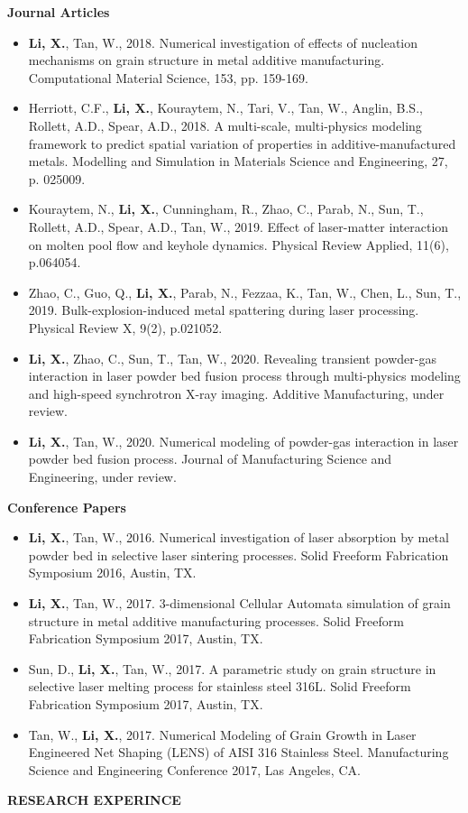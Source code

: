 \documentclass[11pt, letterpaper]{article}
\begin{document}
\textbf{Journal Articles}
\begin{itemize}[leftmargin=*, labelsep=4mm]
   \item \textbf{Li, X.}, Tan, W., 2018. Numerical investigation of effects of nucleation mechanisms on grain structure in metal additive manufacturing. Computational Material Science, 153, pp. 159-169.
   \item Herriott, C.F., \textbf{Li, X.}, Kouraytem, N., Tari, V., Tan, W., Anglin, B.S., Rollett, A.D., Spear, A.D., 2018. A multi-scale, multi-physics modeling framework to predict spatial variation of properties in additive-manufactured metals. Modelling and Simulation in Materials Science and Engineering, 27, p. 025009.
   \item Kouraytem, N., \textbf{Li, X.}, Cunningham, R., Zhao, C., Parab, N., Sun, T., Rollett, A.D., Spear, A.D., Tan, W., 2019. Effect of laser-matter interaction on molten pool flow and keyhole dynamics. Physical Review Applied, 11(6), p.064054.
   \item Zhao, C., Guo, Q., \textbf{Li, X.}, Parab, N., Fezzaa, K., Tan, W., Chen, L., Sun, T., 2019. Bulk-explosion-induced metal spattering during laser processing. Physical Review X, 9(2), p.021052.
   \item \textbf{Li, X.}, Zhao, C., Sun, T., Tan, W., 2020. Revealing transient powder-gas interaction in laser powder bed fusion process through multi-physics modeling and high-speed synchrotron X-ray imaging. Additive Manufacturing, under review. 
   \item \textbf{Li, X.}, Tan, W., 2020. Numerical modeling of powder-gas interaction in laser powder bed fusion process. Journal of Manufacturing Science and Engineering, under review. 
\end{itemize}
\vspace{3pt}
\textbf{Conference Papers}
\begin{itemize}[leftmargin=*, labelsep=5mm]
   \item \textbf{Li, X.}, Tan, W., 2016. Numerical investigation of laser absorption by metal powder bed in selective laser sintering processes. Solid Freeform Fabrication Symposium 2016, Austin, TX.
   \item \textbf{Li, X.}, Tan, W., 2017. 3-dimensional Cellular Automata simulation of grain structure in metal additive manufacturing processes. Solid Freeform Fabrication Symposium 2017, Austin, TX.
   \item Sun, D., \textbf{Li, X.}, Tan, W., 2017. A parametric study on grain structure in selective laser melting process for stainless steel 316L. Solid Freeform Fabrication Symposium 2017, Austin, TX.
   \item Tan, W., \textbf{Li, X.}, 2017. Numerical Modeling of Grain Growth in Laser Engineered Net Shaping (LENS) of AISI 316 Stainless Steel. Manufacturing Science and Engineering Conference 2017, Las Angeles, CA.
\end{itemize}
\vspace{-3pt}
\paraspace
\textbf{RESEARCH EXPERINCE}
\end{document}
